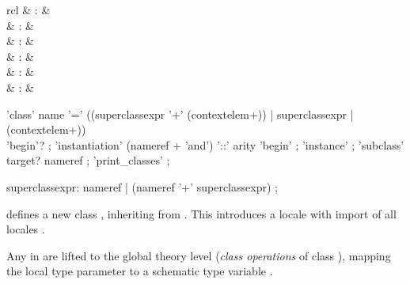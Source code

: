 \begin{isabellebody}
\begin{isamarkuptext}
  \begin{matharray}{rcl}
    \mbox{} & : &  \\
    \mbox{} & : &  \\
    \mbox{} & : &  \\
    \mbox{} & : &  \\
    \mbox{}\isa{{\isachardoublequote}\isactrlsup {\isacharasterisk}{\isachardoublequote}} & : &  \\
    \mbox{} & : & \isarmeth \\
  \end{matharray}

  \begin{rail}
    'class' name '=' ((superclassexpr '+' (contextelem+)) | superclassexpr | (contextelem+)) \\
      'begin'?
    ;
    'instantiation' (nameref + 'and') '::' arity 'begin'
    ;
    'instance'
    ;
    'subclass' target? nameref
    ;
    'print\_classes'
    ;

    superclassexpr: nameref | (nameref '+' superclassexpr)
    ;
  \end{rail}

  \begin{descr}

  \item [\mbox{\isa{\isacommand{class}}}~\isa{{\isachardoublequote}c\ {\isacharequal}\ superclasses\ {\isacharplus}\ body{\isachardoublequote}}] defines
  a new class , inheriting from .  This
  introduces a locale  with import of all locales .

  Any \mbox{} in  are lifted to the global
  theory level (\emph{class operations}  of class ), mapping the local type parameter
  \isa{{\isasymalpha}} to a schematic type variable .


\end{descr}
\end{isamarkuptext}
\end{isabellebody}
